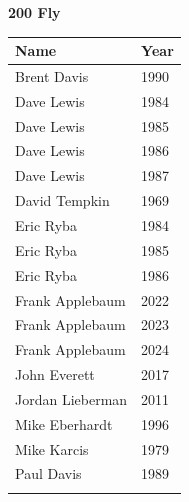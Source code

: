 \noindent\begin{minipage}[t]{0.48\textwidth}
\centering
\textbf{\textcolor{teamprimary}{200 Fly}}\par
\vspace{0.5em}
\centering
\small
\renewcommand{\arraystretch}{1.0}
\setlength{\tabcolsep}{4pt}
\begin{tabular}{@{}p{3.0cm}p{1.0cm}@{}}
\toprule
\textbf{Name} & \textbf{Year} \\
\midrule
Brent Davis & 1990 \\
Dave Lewis & 1984 \\
Dave Lewis & 1985 \\
Dave Lewis & 1986 \\
Dave Lewis & 1987 \\
David Tempkin & 1969 \\
Eric Ryba & 1984 \\
Eric Ryba & 1985 \\
Eric Ryba & 1986 \\
Frank Applebaum & 2022 \\
Frank Applebaum & 2023 \\
Frank Applebaum & 2024 \\
John Everett & 2017 \\
Jordan Lieberman & 2011 \\
Mike Eberhardt & 1996 \\
Mike Karcis & 1979 \\
Paul Davis & 1989 \\
\bottomrule
\vspace{0.5em}
\end{tabular}
\end{minipage}
\hfill
